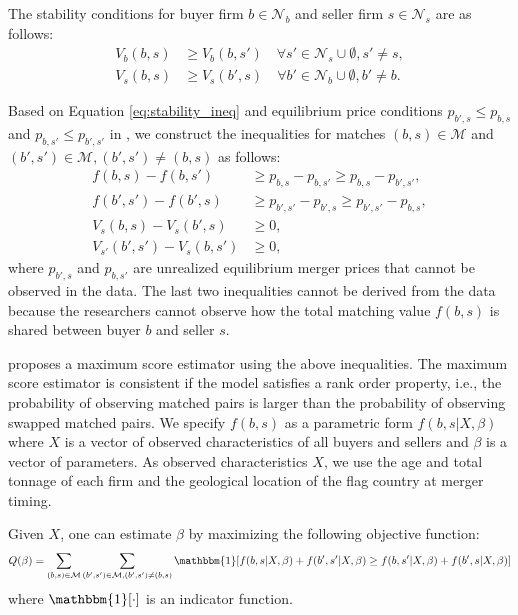 \documentclass[10pt]{article}
\begin{document}
The stability conditions for buyer firm $b \in \mathcal{N}_b$ and seller firm $s \in \mathcal{N}_s$ are as follows:
\begin{align}
    V_b(b,s) &\ge V_b(b,s') \quad \forall s' \in \mathcal{N}_s \cup \emptyset,s'\neq s,\label{eq:stability_ineq}\\
    V_s(b,s) &\ge V_s(b',s) \quad \forall b' \in \mathcal{N}_b\cup \emptyset,b'\neq b.\nonumber
\end{align}

Based on Equation \eqref{eq:stability_ineq} and equilibrium price conditions $p_{b',s}\le p_{b,s}$ and $p_{b,s'}\le p_{b',s'}$ in \cite{akkus2015ms}, we construct the inequalities for matches $(b,s)\in \mathcal{M}$ and $(b',s')\in \mathcal{M}, (b',s')\neq(b,s)$ as follows:
\begin{align}
    f(b,s)-f(b,s')&\ge p_{b,s}-p_{b,s'}\ge p_{b,s}-p_{b',s'},\label{eq:pairwise_stable_ineq}\\
    f(b',s')-f(b',s)&\ge p_{b',s'}-p_{b',s}\ge p_{b',s'}-p_{b,s},\nonumber\\
    V_s(b,s)-V_s(b',s)&\ge 0,\nonumber\\
    V_{s'}(b',s')-V_s(b,s')&\ge 0,\nonumber
\end{align}
where $p_{b',s}$ and $p_{b,s'}$ are unrealized equilibrium merger prices that cannot be observed in the data. The last two inequalities cannot be derived from the data because the researchers cannot observe how the total matching value $f(b,s)$ is shared between buyer $b$ and seller $s$.

\cite{fox2018estimating} proposes a maximum score
estimator using the above inequalities. The maximum score estimator is consistent if the model satisfies a rank order property, i.e., the probability of observing matched pairs is larger than the probability of observing swapped matched pairs. We specify $f(b,s)$ as a parametric form $f(b,s|X,\beta)$ where $X$ is a vector of observed characteristics of all buyers and sellers and $\beta$ is a vector of parameters. As observed characteristics $X$, we use the age and total tonnage of each firm and the geological location of the flag country at merger timing.


Given $X$, one can estimate $\beta$ by maximizing the following objective function:
\begin{align}
    Q(\beta)=\sum_{(b,s)\in \mathcal{M}} \sum_{(b',s')\in \mathcal{M},(b',s')\neq (b,s)} \mathbbm{1}[f(b,s|X,\beta)+ f(b',s'|X,\beta)\ge f(b,s'|X,\beta)+f(b',s|X,\beta)]\label{eq:score_function}
\end{align}
where $\mathbbm{1}[\cdot]$ is an indicator function.
\end{document}
